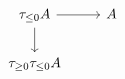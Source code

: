 \documentclass[12pt]{standalone}
\begin{document}
        $$

\begin{tikzcd}
    \tau_{\leq 0} A \ar[r] \ar[d] & A \\
    \tau_{\geq 0} \tau_{\leq 0} A
\end{tikzcd}
        $$
        
\end{document}
